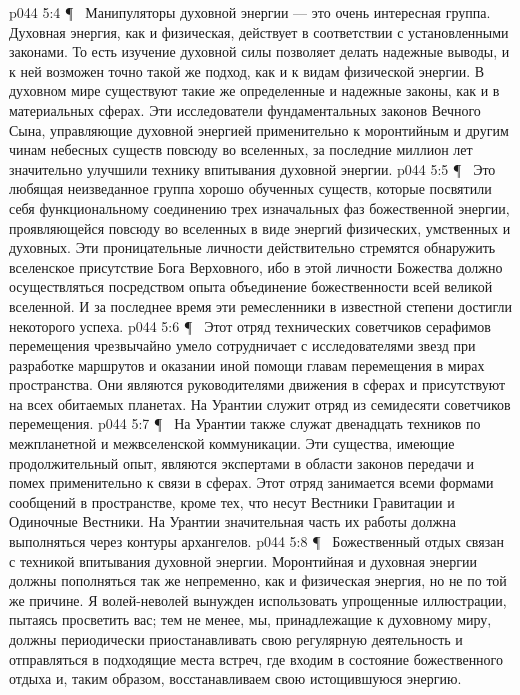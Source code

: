 \vs p044 5:4 \P\ \bibnobreakspace {} Манипуляторы духовной энергии --- это очень интересная группа. Духовная энергия, как и физическая, действует в соответствии с установленными законами. То есть изучение духовной силы позволяет делать надежные выводы, и к ней возможен точно такой же подход, как и к видам физической энергии. В духовном мире существуют такие же определенные и надежные законы, как и в материальных сферах. Эти исследователи фундаментальных законов Вечного Сына, управляющие духовной энергией применительно к моронтийным и другим чинам небесных существ повсюду во вселенных, за последние миллион лет значительно улучшили технику впитывания духовной энергии.
\vs p044 5:5 \P\ \bibnobreakspace {} Это любящая неизведанное группа хорошо обученных существ, которые посвятили себя функциональному соединению трех изначальных фаз божественной энергии, проявляющейся повсюду во вселенных в виде энергий физических, умственных и духовных. Эти проницательные личности действительно стремятся обнаружить вселенское присутствие Бога Верховного, ибо в этой личности Божества должно осуществляться посредством опыта объединение божественности всей великой вселенной. И за последнее время эти ремесленники в известной степени достигли некоторого успеха.
\vs p044 5:6 \P\ \bibnobreakspace {} Этот отряд технических советчиков серафимов перемещения чрезвычайно умело сотрудничает с исследователями звезд при разработке маршрутов и оказании иной помощи главам перемещения в мирах пространства. Они являются руководителями движения в сферах и присутствуют на всех обитаемых планетах. На Урантии служит отряд из семидесяти советчиков перемещения.
\vs p044 5:7 \P\ \bibnobreakspace {} На Урантии также служат двенадцать техников по межпланетной и межвселенской коммуникации. Эти существа, имеющие продолжительный опыт, являются экспертами в области законов передачи и помех применительно к связи в сферах. Этот отряд занимается всеми формами сообщений в пространстве, кроме тех, что несут Вестники Гравитации и Одиночные Вестники. На Урантии значительная часть их работы должна выполняться через контуры архангелов.
\vs p044 5:8 \P\ \bibnobreakspace {} Божественный отдых связан с техникой впитывания духовной энергии. Моронтийная и духовная энергии должны пополняться так же непременно, как и физическая энергия, но не по той же причине. Я волей\hyp{}неволей вынужден использовать упрощенные иллюстрации, пытаясь просветить вас; тем не менее, мы, принадлежащие к духовному миру, должны периодически приостанавливать свою регулярную деятельность и отправляться в подходящие места встреч, где входим в состояние божественного отдыха и, таким образом, восстанавливаем свою истощившуюся энергию.
